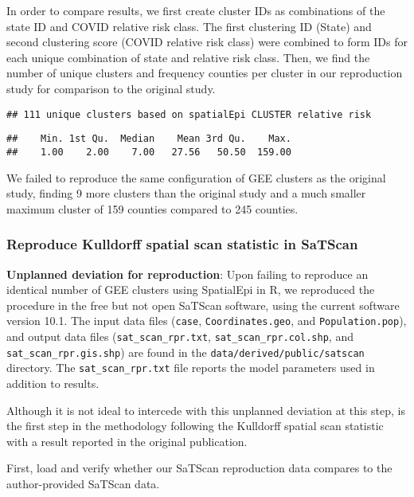 \documentclass[
]{article}
\begin{document}
In order to compare results, we first create cluster IDs as combinations
of the state ID and COVID relative risk class. The first clustering ID
(State) and second clustering score (COVID relative risk class) were
combined to form IDs for each unique combination of state and relative
risk class. Then, we find the number of unique clusters and frequency
counties per cluster in our reproduction study for comparison to the
original study.

\begin{verbatim}
## 111 unique clusters based on spatialEpi CLUSTER relative risk
\end{verbatim}

\begin{verbatim}
##    Min. 1st Qu.  Median    Mean 3rd Qu.    Max. 
##    1.00    2.00    7.00   27.56   50.50  159.00
\end{verbatim}

We failed to reproduce the same configuration of GEE clusters as the
original study, finding 9 more clusters than the original study and a
much smaller maximum cluster of 159 counties compared to 245 counties.

\hypertarget{reproduce-kulldorff-spatial-scan-statistic-in-satscan}{%
\subsubsection{Reproduce Kulldorff spatial scan statistic in
SaTScan}\label{reproduce-kulldorff-spatial-scan-statistic-in-satscan}}

\textbf{Unplanned deviation for reproduction}: Upon failing to reproduce
an identical number of GEE clusters using SpatialEpi in R, we reproduced
the procedure in the free but not open SaTScan software, using the
current software version 10.1. The input data files (\texttt{case},
\texttt{Coordinates.geo}, and \texttt{Population.pop}), and output data
files (\texttt{sat\_scan\_rpr.txt}, \texttt{sat\_scan\_rpr.col.shp}, and
\texttt{sat\_scan\_rpr.gis.shp}) are found in the
\texttt{data/derived/public/satscan} directory. The
\texttt{sat\_scan\_rpr.txt} file reports the model parameters used in
addition to results.

Although it is not ideal to intercede with this unplanned deviation at
this step, is the first step in the methodology following the Kulldorff
spatial scan statistic with a result reported in the original
publication.

First, load and verify whether our SaTScan reproduction data compares to
the author-provided SaTScan data.
\end{document}
